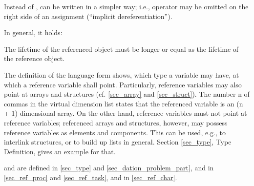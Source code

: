 Instead of , 
 can be written in a simpler way; i.e.,
operator  may be omitted on the right side of an assignment
(``implicit dereferentiation'').

In general, it holds:

\begin{grammarframe}



\end{grammarframe}

The lifetime of the referenced object must be longer or equal as
the lifetime of the reference object.

The definition of the language form  shows, which type a
variable may have, at which a reference variable shall point.
Particularly, reference variables may also point at arrays and
structures (cf. \ref{sec_array} and \ref{sec_struct}).
 The number n of commas in the virtual
dimension list states that the referenced variable is an (n + 1)
dimensional array. On the other hand, reference variables must not point
at reference variables; referenced arrays and structures, however, may
possess reference variables as elements and components. This can be
used, e.g., to interlink structures, or to build up lists in general.
Section \ref{sec_type}, Type Definition, gives an example for that.

 and  are defined in \ref{sec_type} and 
\ref{sec_dation_problem_part},  and 
 in \ref{sec_ref_proc} and \ref{sec_ref_task},
 and  in 
 \ref{sec_ref_char}.


